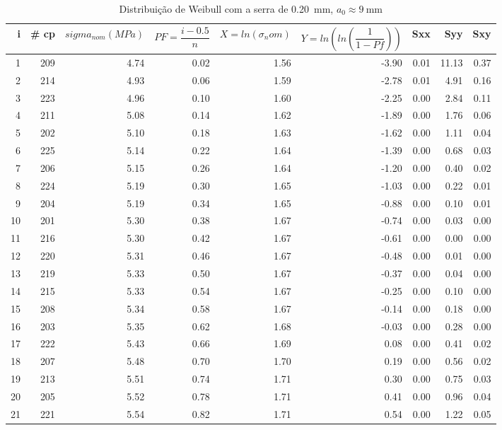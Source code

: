 \begin{table}[H]
\centering
\caption{Distribuição de Weibull com a serra de \SI{0.20}{\mm}, $a_{0} \approx \SI{9}{\mm}$}
\label{tb:weibull_02_09}
\resizebox{14cm}{!} {
\begin{tabular}{@{}rrrrrrrrr@{}}
\toprule
i & \# cp & $sigma_{nom} (MPa)$ & $PF = \dfrac{i - 0.5}{n}$ & $X = ln(\sigma_nom)$ & $Y = ln\left(ln\left(\dfrac{1}{1-Pf}\right)\right)$ & Sxx & Syy & Sxy \\ 
\midrule
1 & 209 & 4.74 & 0.02 & 1.56 & -3.90 & 0.01 & 11.13 & 0.37 \\
2 & 214 & 4.93 & 0.06 & 1.59 & -2.78 & 0.01 & 4.91 & 0.16 \\
3 & 223 & 4.96 & 0.10 & 1.60 & -2.25 & 0.00 & 2.84 & 0.11 \\
4 & 211 & 5.08 & 0.14 & 1.62 & -1.89 & 0.00 & 1.76 & 0.06 \\
5 & 202 & 5.10 & 0.18 & 1.63 & -1.62 & 0.00 & 1.11 & 0.04 \\
6 & 225 & 5.14 & 0.22 & 1.64 & -1.39 & 0.00 & 0.68 & 0.03 \\
7 & 206 & 5.15 & 0.26 & 1.64 & -1.20 & 0.00 & 0.40 & 0.02 \\
8 & 224 & 5.19 & 0.30 & 1.65 & -1.03 & 0.00 & 0.22 & 0.01 \\
9 & 204 & 5.19 & 0.34 & 1.65 & -0.88 & 0.00 & 0.10 & 0.01 \\
10 & 201 & 5.30 & 0.38 & 1.67 & -0.74 & 0.00 & 0.03 & 0.00 \\
11 & 216 & 5.30 & 0.42 & 1.67 & -0.61 & 0.00 & 0.00 & 0.00 \\
12 & 220 & 5.31 & 0.46 & 1.67 & -0.48 & 0.00 & 0.01 & 0.00 \\
13 & 219 & 5.33 & 0.50 & 1.67 & -0.37 & 0.00 & 0.04 & 0.00 \\
14 & 215 & 5.33 & 0.54 & 1.67 & -0.25 & 0.00 & 0.10 & 0.00 \\
15 & 208 & 5.34 & 0.58 & 1.67 & -0.14 & 0.00 & 0.18 & 0.00 \\
16 & 203 & 5.35 & 0.62 & 1.68 & -0.03 & 0.00 & 0.28 & 0.00 \\
17 & 222 & 5.43 & 0.66 & 1.69 & 0.08 & 0.00 & 0.41 & 0.02 \\
18 & 207 & 5.48 & 0.70 & 1.70 & 0.19 & 0.00 & 0.56 & 0.02 \\
19 & 213 & 5.51 & 0.74 & 1.71 & 0.30 & 0.00 & 0.75 & 0.03 \\
20 & 205 & 5.52 & 0.78 & 1.71 & 0.41 & 0.00 & 0.96 & 0.04 \\
21 & 221 & 5.54 & 0.82 & 1.71 & 0.54 & 0.00 & 1.22 & 0.05 \\

\end{tabular}}
\end{table}
